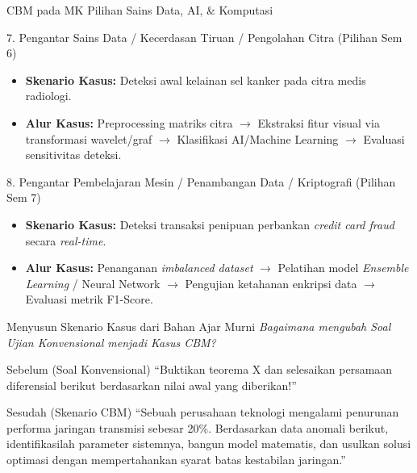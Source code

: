 \documentclass[aspectratio=169]{beamer} %
\begin{document}
\begin{frame}{CBM pada MK Pilihan Sains Data, AI, \& Komputasi}
    \begin{block}{7. Pengantar Sains Data / Kecerdasan Tiruan / Pengolahan Citra (Pilihan Sem 6)}
        \begin{itemize}
            \item \textbf{Skenario Kasus:} Deteksi awal kelainan sel kanker pada citra medis radiologi.
            \item \textbf{Alur Kasus:} Preprocessing matriks citra $\rightarrow$ Ekstraksi fitur visual via transformasi wavelet/graf $\rightarrow$ Klasifikasi AI/Machine Learning $\rightarrow$ Evaluasi sensitivitas deteksi.
        \end{itemize}
    \end{block}

    \begin{block}{8. Pengantar Pembelajaran Mesin / Penambangan Data / Kriptografi (Pilihan Sem 7)}
        \begin{itemize}
            \item \textbf{Skenario Kasus:} Deteksi transaksi penipuan perbankan \textit{credit card fraud} secara \textit{real-time}.
            \item \textbf{Alur Kasus:} Penanganan \textit{imbalanced dataset} $\rightarrow$ Pelatihan model \textit{Ensemble Learning} / Neural Network $\rightarrow$ Pengujian ketahanan enkripsi data $\rightarrow$ Evaluasi metrik F1-Score.
        \end{itemize}
    \end{block}
\end{frame}

\begin{frame}{Menyusun Skenario Kasus dari Bahan Ajar Murni}
    \textit{Bagaimana mengubah Soal Ujian Konvensional menjadi Kasus CBM?}
    \vspace{0.4cm}
    \begin{exampleblock}{Sebelum (Soal Konvensional)}
        ``Buktikan teorema X dan selesaikan persamaan diferensial berikut berdasarkan nilai awal yang diberikan!''
    \end{exampleblock}
    \vspace{0.2cm}
    \begin{alertblock}{Sesudah (Skenario CBM)}
        ``Sebuah perusahaan teknologi mengalami penurunan performa jaringan transmisi sebesar 20\%. Berdasarkan data anomali berikut, identifikasilah parameter sistemnya, bangun model matematis, dan usulkan solusi optimasi dengan mempertahankan syarat batas kestabilan jaringan.''
    \end{alertblock}
\end{frame}
\end{document}
